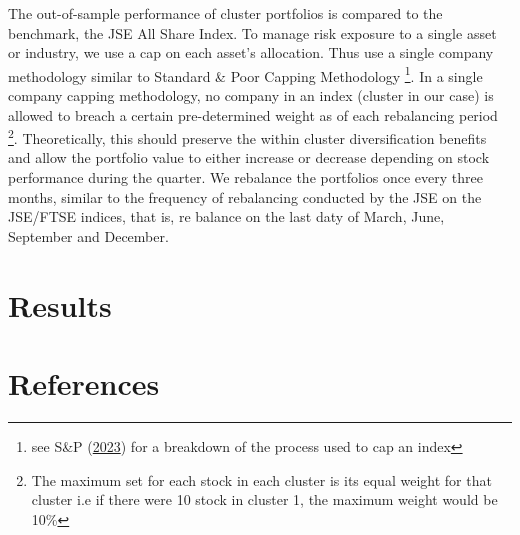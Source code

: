 \documentclass[11pt,preprint, authoryear]{elsarticle}
\numberwithin{equation}{section}
\numberwithin{figure}{section}
\numberwithin{table}{section}
\let\rmarkdownfootnote\footnote%
\def\footnote{\protect\rmarkdownfootnote}
\begin{document}
The out-of-sample performance of cluster portfolios is compared to the
benchmark, the JSE All Share Index. To manage risk exposure to a single
asset or industry, we use a cap on each asset's allocation. Thus use a
single company methodology similar to Standard \& Poor Capping
Methodology \footnote{see S\&P (\protect\hyperlink{ref-sp}{2023}) for a
  breakdown of the process used to cap an index}. In a single company
capping methodology, no company in an index (cluster in our case) is
allowed to breach a certain pre-determined weight as of each rebalancing
period \footnote{The maximum set for each stock in each cluster is its
  equal weight for that cluster i.e if there were 10 stock in cluster 1,
  the maximum weight would be 10\%}. Theoretically, this should preserve
the within cluster diversification benefits and allow the portfolio
value to either increase or decrease depending on stock performance
during the quarter. We rebalance the portfolios once every three months,
similar to the frequency of rebalancing conducted by the JSE on the
JSE/FTSE indices, that is, re balance on the last daty of March, June,
September and December.

\newpage

\hypertarget{results}{%
\section{\texorpdfstring{Results
\label{Results}}{Results }}\label{results}}

\newpage

\hypertarget{references}{%
\section{References}\label{references}}
\end{document}
